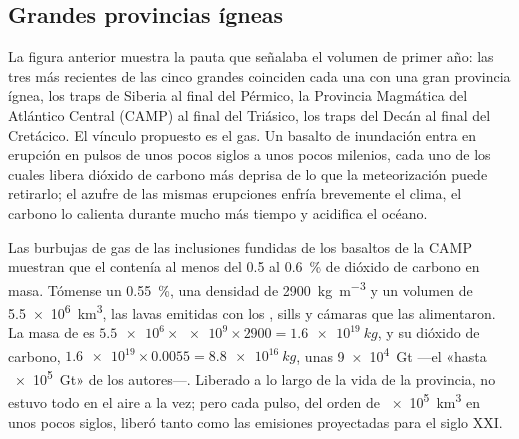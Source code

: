 
\subsection*{Grandes provincias ígneas}

La figura anterior muestra la pauta que señalaba el volumen de primer año: las tres más recientes de
las cinco grandes coinciden cada una con una gran provincia ígnea, los traps de Siberia al final del Pérmico,
la Provincia Magmática del Atlántico Central (CAMP) al final del Triásico, los traps del Decán al
final del Cretácico. El vínculo propuesto es el gas. Un basalto de inundación entra en erupción en pulsos de unos pocos
siglos a unos pocos milenios, cada uno de los cuales libera dióxido de carbono más deprisa de lo que la meteorización puede
retirarlo; el azufre de las mismas erupciones enfría brevemente el clima, el carbono lo calienta durante mucho
más tiempo y acidifica el océano.

\begin{example}\label{ex:b2:phanerozoic-earth:camp}
Las burbujas de gas de las inclusiones fundidas de los basaltos de la CAMP muestran que el  contenía al menos del 0.5 al
\qty{0.6}{\percent} de dióxido de carbono en masa. Tómense un \qty{0.55}{\percent}, una densidad de
\qty{2900}{kg.m^{-3}} y un volumen de \qty{5.5e6}{km^3}, las lavas emitidas con los , sills
y cámaras que las alimentaron. La masa de  es $\num{5.5e6} \times \num{e9} \times 2900 =
\qty{1.6e19}{kg}$, y su dióxido de carbono, $\num{1.6e19} \times 0.0055 = \qty{8.8e16}{kg}$, unas
\qty{9e4}{Gt} ---el «hasta \qty{e5}{Gt}» de los autores---. Liberado a lo largo de la vida de la provincia, no
estuvo todo en el aire a la vez; pero cada pulso, del orden de \qty{e5}{km^3} en unos pocos
siglos, liberó tanto como las emisiones proyectadas para el siglo XXI.
\end{example}


